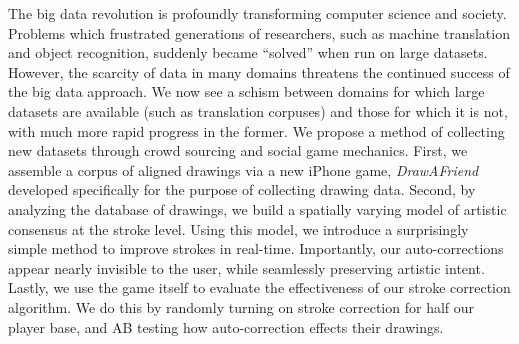 The big data revolution is profoundly transforming computer science and society. Problems which frustrated generations of researchers, such as machine translation and object recognition, suddenly became ``solved'' when run on large datasets. However, the scarcity of data in many domains threatens the continued success of the big data approach. We now see a schism between domains for which large datasets are available (such as translation corpuses) and those for which it is not, with much more rapid progress in the former.  We propose a method of collecting new datasets through crowd sourcing and social game mechanics.  First, we assemble a corpus of aligned drawings via a new iPhone game, {\em DrawAFriend} developed specifically for the purpose of collecting drawing data. Second, by analyzing the database of drawings, we build a spatially varying model of artistic consensus at the stroke level. Using this model, we introduce a
surprisingly simple method to improve strokes in real-time. Importantly, our auto-corrections appear nearly invisible to the user, while seamlessly preserving artistic intent. Lastly, we use the game itself to evaluate the effectiveness of our stroke correction algorithm. We do this by randomly turning on stroke correction for half our player base, and AB testing how auto-correction effects their drawings. 